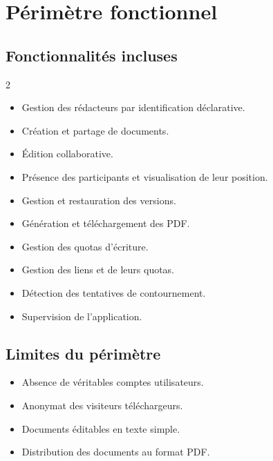\chapter{Périmètre fonctionnel}

\section{Fonctionnalités incluses}
\begin{multicols}{2}
\begin{itemize}
    \item Gestion des rédacteurs par identification déclarative.
    \item Création et partage de documents.
    \item Édition collaborative.
    \item Présence des participants et visualisation de leur position.
    \item Gestion et restauration des versions.
    \item Génération et téléchargement des PDF.
    \item Gestion des quotas d'écriture.
    \item Gestion des liens et de leurs quotas.
    \item Détection des tentatives de contournement.
    \item Supervision de l'application.
\end{itemize}
\end{multicols}

\section{Limites du périmètre}
\begin{itemize}
    \item Absence de véritables comptes utilisateurs.
    \item Anonymat des visiteurs téléchargeurs.
    \item Documents éditables en texte simple.
    \item Distribution des documents au format PDF.
\end{itemize}

